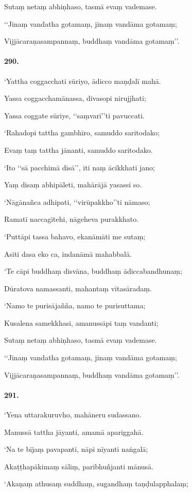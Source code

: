 Sutaṃ netaṃ abhiṇhaso, tasmā evaṃ vademase.

‘‘Jinaṃ vandatha gotamaṃ, jinaṃ vandāma gotamaṃ;

Vijjācaraṇasampannaṃ, buddhaṃ vandāma gotamaṃ’’.

\paragraph{290.} ‘Yattha coggacchati sūriyo, ādicco maṇḍalī mahā.

Yassa coggacchamānassa, divasopi nirujjhati;

Yassa coggate sūriye, ‘‘saṃvarī’’ti pavuccati.

‘Rahadopi tattha gambhīro, samuddo saritodako;

Evaṃ taṃ tattha jānanti, samuddo saritodako.

‘Ito ‘‘sā pacchimā disā’’, iti naṃ ācikkhatī jano;

Yaṃ disaṃ abhipāleti, mahārājā yasassi so.

‘Nāgānañca adhipati, ‘‘virūpakkho’’ti nāmaso;

Ramatī naccagītehi, nāgeheva purakkhato.

‘Puttāpi tassa bahavo, ekanāmāti me sutaṃ;

Asīti dasa eko ca, indanāmā mahabbalā.

‘Te cāpi buddhaṃ disvāna, buddhaṃ ādiccabandhunaṃ;

Dūratova namassanti, mahantaṃ vītasāradaṃ.

‘Namo te purisājañña, namo te purisuttama;

Kusalena samekkhasi, amanussāpi taṃ vandanti;

Sutaṃ netaṃ abhiṇhaso, tasmā evaṃ vademase.

‘‘Jinaṃ vandatha gotamaṃ, jinaṃ vandāma gotamaṃ;

Vijjācaraṇasampannaṃ, buddhaṃ vandāma gotamaṃ’’.

\paragraph{291.} ‘Yena uttarakuruvho, mahāneru sudassano.

Manussā tattha jāyanti, amamā apariggahā.

‘Na te bījaṃ pavapanti, nāpi nīyanti naṅgalā;

Akaṭṭhapākimaṃ sāliṃ, paribhuñjanti mānusā.

‘Akaṇaṃ athusaṃ suddhaṃ, sugandhaṃ taṇḍulapphalaṃ;

